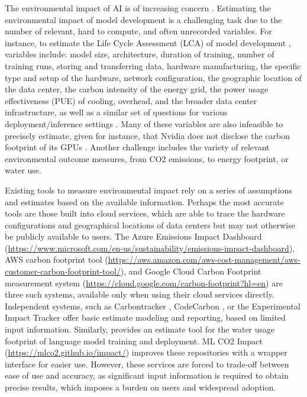 The environmental impact of AI is of increasing concern \citep{schwartz2020green}.
Estimating the environmental impact of model development is a challenging task due to the number of relevant, hard to compute, and often unrecorded variables.
For instance, to estimate the Life Cycle Assessment (LCA) of model development \citep{klopffer1997life}, variables include: model size, architecture, duration of training, number of training runs, storing and transferring data, hardware manufacturing, the specific type and setup of the hardware, network configuration, the geographic location of the data center, the carbon intensity of the energy grid, the power usage effectiveness (PUE) of cooling, overhead, and the broader data center infrastructure, as well as a similar set of questions for various deployment/inference settings \citep{patterson2021carbon}.
Many of these variables are also infeasible to precisely estimate, given for instance, that Nvidia does not disclose the carbon footprint of its GPUs \citep{luccioni2023estimating}.
Another challenge includes the variety of relevant environmental outcome measures, from CO2 emissions, to energy footprint, or water use.

Existing tools to measure environmental impact rely on a series of assumptions and estimates based on the available information.
Perhaps the most accurate tools are those built into cloud services, which are able to trace the hardware configurations and geographical locations of data centers but may not otherwise be publicly available to users.
The Azure Emissions Impact Dashboard (\url{https://www.microsoft.com/en-us/sustainability/emissions-impact-dashboard}), AWS carbon footprint tool (\url{https://aws.amazon.com/aws-cost-management/aws-customer-carbon-footprint-tool/}), and Google Cloud Carbon Footprint measurement system (\url{https://cloud.google.com/carbon-footprint?hl=en}) are three such systems, available only when using their cloud services directly.
Independent systems, such as Carbontracker \citep{anthony2020carbontracker}, CodeCarbon \citep{schmidt2021codecarbon}, or the Experimental Impact Tracker \citep{henderson2020towards} offer basic estimate modeling and reporting, based on limited input information.
Similarly, \citet{li2023making} provides an estimate tool for the water usage footprint of language model training and deployment.
ML CO2 Impact (\url{https://mlco2.github.io/impact/}) improves these repositories with a wrapper interface for easier use.
However, these services are forced to trade-off between ease of use and accuracy, as significant input information is required to obtain precise results, which imposes a burden on users and widespread adoption.
 
